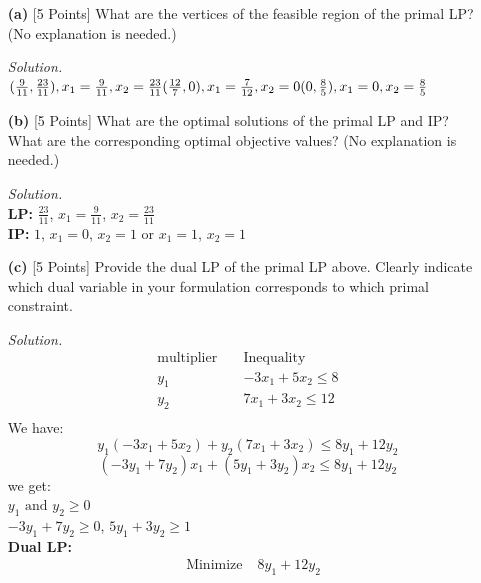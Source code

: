 \documentclass[10pt]{article}
\begin{document}
\begin{itemize}
    \item [\textbf{(a)}] {[5 Points]} What are the vertices of the feasible region of the primal LP? (No explanation is needed.)
    \begin{mdframed}
        \textit{Solution.}\\
        $(\frac{9}{11}, \frac{23}{11}), x_1=\frac{9}{11}, x_2 = \frac{23}{11}\\
        (\frac{12}{7}, 0), x_1=\frac{7}{12}, x_2 = 0\\
        (0, \frac{8}{5}), x_1=0, x_2 = \frac{8}{5}$
    \end{mdframed}
    \item [\textbf{(b)}] {[5 Points]} What are the optimal solutions of the primal LP and IP? What are the corresponding optimal objective values? (No explanation is needed.)
    \begin{mdframed}
        \textit{Solution.}\\
        \textbf{LP:} $\frac{23}{11}$, $x_1 = \frac{9}{11}$, $x_2 = \frac{23}{11}$\\
        \textbf{IP:} $1$, $x_1 = 0$, $x_2 = 1$ or $x_1 = 1$, $x_2 = 1$
    \end{mdframed}
    \item [\textbf{(c)}] {[5 Points]} Provide the dual LP of the primal LP above. Clearly indicate which dual variable in your formulation corresponds to which primal constraint.
    \begin{mdframed}
        \textit{Solution.}
        \begin{align*}
            \text{multiplier}& \; &\text{Inequality}\\
            y_1& \; &-3x_1 + 5x_2 \leq 8\\
            y_2& \; &7x_1 + 3x_2 \leq 12\\
        \end{align*}
        We have:\\
        $$y_1(-3x_1+5x_2) + y_2(7x_1+3x_2) \leq 8y_1+12y_2$$
        $$(-3y_1+7y_2)x_1 + (5y_1+3y_2)x_2 \leq 8y_1+12y_2$$
        we get:\\
        $y_1 \text{ and } y_2 \geq 0$\\
        $-3y_1+7y_2 \geq 0$, $5y_1+3y_2 \geq 1$\\
        \textbf{Dual LP:}
        \begin{align*}
            &\text{Minimize} \; &8y_1+12y_2\\

\end{align*}
\end{mdframed}
\end{itemize}
\end{document}
